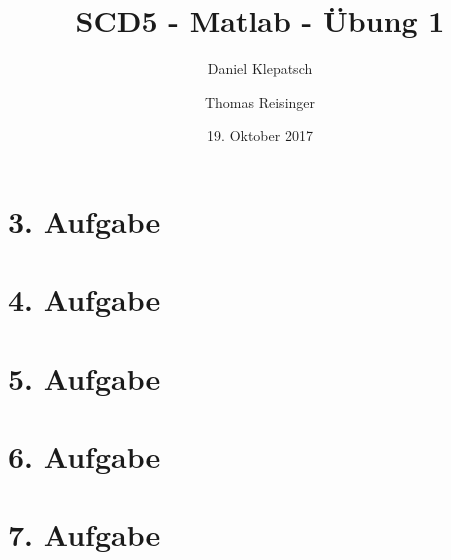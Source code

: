 


\title{SCD5 - Matlab - Übung 1}
\date{19. Oktober 2017}
\author{Daniel Klepatsch \and Thomas Reisinger}
        
\maketitle

\newpage



\tableofcontents

\newpage

\section{3. Aufgabe}


\newpage

\section{4. Aufgabe}


\newpage

\section{5. Aufgabe}


\newpage

\section{6. Aufgabe}


\newpage

\section{7. Aufgabe}


